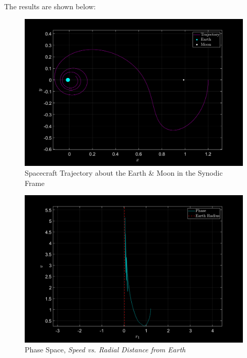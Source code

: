 \vspace{\baselineskip}

The results are shown below:

\begin{figure}[h]
    \centering
    \includegraphics[width=\textwidth]{fig/trajectory2.png}
    \caption{Spacecraft Trajectory about the Earth \& Moon in the Synodic Frame}
    \label{fig3}
\end{figure}

\pagebreak

\begin{figure}[!h]
    \centering
    \includegraphics[width=\textwidth]{fig/phase2.png}
    \caption{Phase Space, \textit{Speed vs. Radial Distance from Earth}}
    \label{fig4}
\end{figure}


